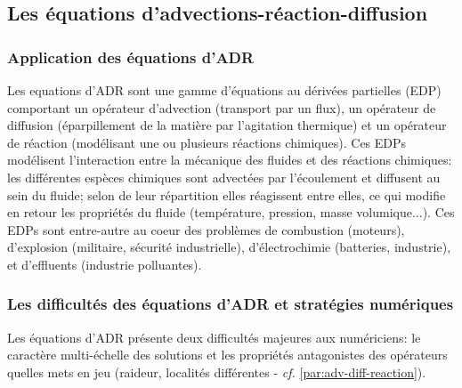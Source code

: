 \subsection{Les équations d'advections-réaction-diffusion}
    \subsubsection{Application des équations d'ADR}
    Les equations d'ADR sont une gamme d'équations au dérivées partielles (EDP) comportant un opérateur d'advection (transport par un flux),
    un opérateur de diffusion (éparpillement de la matière par l'agitation thermique) et un opérateur de réaction (modélisant une ou plusieurs réactions chimiques).
    Ces EDPs modélisent l'interaction entre la mécanique des fluides et des réactions chimiques: les différentes espèces chimiques sont advectées par l'écoulement et diffusent au sein du fluide;
    selon de leur répartition elles réagissent entre elles, ce qui modifie en retour les propriétés du fluide (température, pression, masse volumique...). 
    Ces EDPs sont entre-autre au coeur des problèmes de combustion (moteurs), d'explosion (militaire, sécurité industrielle), d’électrochimie (batteries, industrie), 
    et d’effluents (industrie polluantes).
    \subsubsection{Les difficultés des équations d'ADR et stratégies numériques}
    Les équations d'ADR présente deux difficultés majeures aux numériciens: le caractère multi-échelle des solutions et les propriétés antagonistes des opérateurs quelles mets en jeu
    (raideur, localités différentes - \textit{cf.} \ref{par:adv-diff-reaction}).\par

